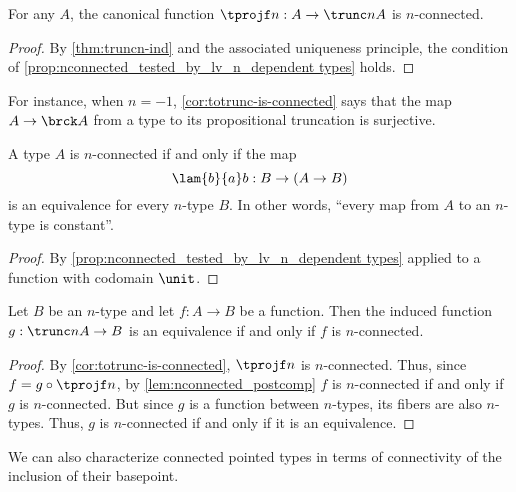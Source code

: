 \begin{cor}\label{cor:totrunc-is-connected}
For any $A$, the canonical function $\tprojf n:A\to\trunc n A$ is $n$-connected.
\end{cor}
\begin{proof}
By \cref{thm:truncn-ind} and the associated uniqueness principle, the condition of \cref{prop:nconnected_tested_by_lv_n_dependent types} holds.
\end{proof}

For instance, when $n=-1$, \cref{cor:totrunc-is-connected} says that the map $A\to \brck A$ from a type to its propositional truncation is surjective.

\begin{cor}\label{thm:nconn-to-ntype-const}\label{connectedtotruncated}
A type $A$ is $n$-connected if and only if the map
\begin{equation*}
  \lam{b}{a} b: B \to (A\to B)
\end{equation*}
is an equivalence for every $n$-type $B$.
In other words, ``every map from $A$ to an $n$-type is constant''.
\end{cor}
\begin{proof}
  By \cref{prop:nconnected_tested_by_lv_n_dependent types} applied to a function with codomain $\unit$.
\end{proof}

\begin{lem}\label{lem:nconnected_to_leveln_to_equiv}
Let $B$ be an $n$-type and let $f:A\to B$ be a function. Then the induced function $g:\trunc n A\to B$ is an
equivalence if and only if $f$ is $n$-connected.
\end{lem}

\begin{proof}
By \cref{cor:totrunc-is-connected}, $\tprojf n$ is $n$-connected.
Thus, since $f = g\circ \tprojf n$, by
\cref{lem:nconnected_postcomp} $f$ is $n$-connected if and only if $g$ is $n$-connected.
But since $g$ is a function between $n$-types, its fibers are also $n$-types.
Thus, $g$ is $n$-connected if and only if it is an equivalence.
\end{proof}

We can also characterize connected pointed types in terms of connectivity of the inclusion of their basepoint.

